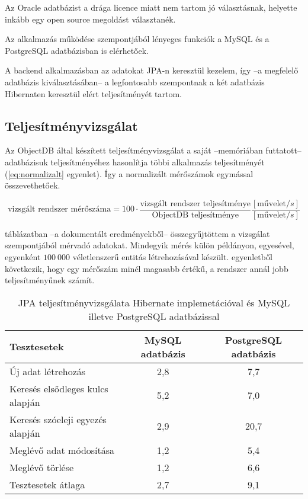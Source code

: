 Az Oracle adatbázist a drága licence miatt nem tartom jó választásnak, helyette inkább egy open source megoldást választanék.

Az alkalmazás működése szempontjából lényeges funkciók a MySQL és a PostgreSQL adatbázisban is elérhetőek.

A backend alkalmazásban az adatokat JPA-n keresztül kezelem, így --a megfelelő adatbázis kiválasztásában-- a legfontosabb szempontnak a két adatbázis Hibernaten keresztül elért teljesítményét tartom.

\subsection{Teljesítményvizsgálat}
Az ObjectDB által készített teljesítményvizsgálat\cite{JPA_benchmark} a saját --memóriában futtatott-- adatbázisuk teljesítményéhez hasonlítja többi alkalmazás teljesítményét (\ref{eq:normalizalt} egyenlet). Így a normalizált mérőszámok egymással összevethetőek.

\begin{equation}
\textrm{vizsgált rendszer mérőszáma} = 100 \cdot
\frac{\textrm{vizsgált rendszer teljesítménye}}{\textrm{ObjectDB teljesítménye}}
\frac{[\textrm{művelet}/s]}{[\textrm{művelet}/s]}
\label{eq:normalizalt}
\end{equation}

 táblázatban --a dokumentált eredményekből\cite{JPA_benchmark}-- összegyűjtöttem a vizsgálat szempontjából mérvadó adatokat. Mindegyik mérés külön példányon, egyesével, egyenként $100~000$ véletlenszerű entitás létrehozásával készült.  egyenletből következik, hogy egy mérőszám minél magasabb értékű, a rendszer annál jobb teljesítményűnek számít.

\begin{table}[hbt]
	
	\begin{tabular}{lc|c}
		Tesztesetek & MySQL adatbázis & PostgreSQL adatbázis \\\hline 
		
		Új adat létrehozás & 2,8 & 7,7\\ \hline
		Keresés elsődleges kulcs alapján  & 5,2 & 7,0\\ \hline
		Keresés szóeleji egyezés alapján & 2,9 & 20,7\\ \hline
		Meglévő adat módosítása & 1,2 & 5,4\\ \hline
		Meglévő törlése & 1,2 & 6,6 \\ \hline
		Tesztesetek átlaga & 2,7 & 9,1
	\end{tabular} 
	
	\caption{JPA teljesítményvizsgálata Hibernate implemetációval és  MySQL illetve PostgreSQL adatbázissal }
	\label{tabl:teljesitmenyvizsgalat}
\end{table}


